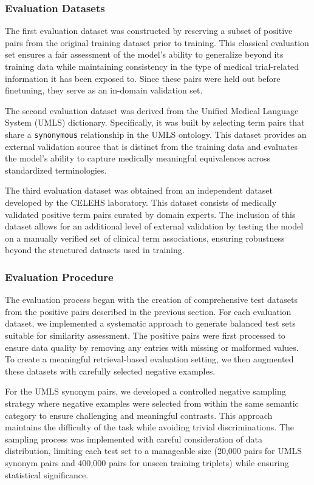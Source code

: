 \subsubsection{Evaluation Datasets}

The first evaluation dataset was constructed by reserving a subset of positive pairs from the original training dataset prior to training. This classical evaluation set ensures a fair assessment of the model's ability to generalize beyond its training data while maintaining consistency in the type of medical trial-related information it has been exposed to. Since these pairs were held out before finetuning, they serve as an in-domain validation set.

The second evaluation dataset was derived from the Unified Medical Language System (UMLS) dictionary. Specifically, it was built by selecting term pairs that share a \texttt{synonymous} relationship in the UMLS ontology. This dataset provides an external validation source that is distinct from the training data and evaluates the model's ability to capture medically meaningful equivalences across standardized terminologies.

The third evaluation dataset was obtained from an independent dataset developed by the CELEHS laboratory. This dataset consists of medically validated positive term pairs curated by domain experts. The inclusion of this dataset allows for an additional level of external validation by testing the model on a manually verified set of clinical term associations, ensuring robustness beyond the structured datasets used in training.

\subsubsection{Evaluation Procedure}

The evaluation process began with the creation of comprehensive test datasets from the positive pairs described in the previous section. For each evaluation dataset, we implemented a systematic approach to generate balanced test sets suitable for similarity assessment. The positive pairs were first processed to ensure data quality by removing any entries with missing or malformed values. To create a meaningful retrieval-based evaluation setting, we then augmented these datasets with carefully selected negative examples.

For the UMLS synonym pairs, we developed a controlled negative sampling strategy where negative examples were selected from within the same semantic category to ensure challenging and meaningful contrasts. This approach maintains the difficulty of the task while avoiding trivial discriminations. The sampling process was implemented with careful consideration of data distribution, limiting each test set to a manageable size (20,000 pairs for UMLS synonym pairs and 400,000 pairs for unseen training triplets) while ensuring statistical significance.

